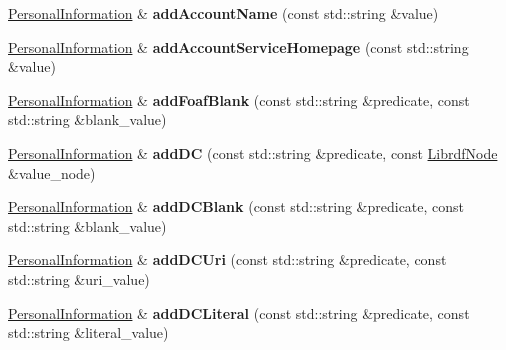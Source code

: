 \begin{DoxyCompactItemize}
\mbox{\label{classomexmeta_1_1PersonalInformation_a9fd33e3189e1f77725e54dd24cc9dcb7}} 
\hyperlink{classomexmeta_1_1PersonalInformation}{Personal\+Information} \& {\bfseries add\+Account\+Name} (const std\+::string \&value)
\item 
\mbox{\label{classomexmeta_1_1PersonalInformation_a344fc47bde65f8c0ea75409160fdfe00}} 
\hyperlink{classomexmeta_1_1PersonalInformation}{Personal\+Information} \& {\bfseries add\+Account\+Service\+Homepage} (const std\+::string \&value)
\item 
\mbox{\label{classomexmeta_1_1PersonalInformation_af26bf72dc840b9c45fa7494f7164c04d}} 
\hyperlink{classomexmeta_1_1PersonalInformation}{Personal\+Information} \& {\bfseries add\+Foaf\+Blank} (const std\+::string \&predicate, const std\+::string \&blank\+\_\+value)
\item 
\mbox{\label{classomexmeta_1_1PersonalInformation_a1df32d40f46d98767fc360015bf0f3ed}} 
\hyperlink{classomexmeta_1_1PersonalInformation}{Personal\+Information} \& {\bfseries add\+DC} (const std\+::string \&predicate, const \hyperlink{classredland_1_1LibrdfNode}{Librdf\+Node} \&value\+\_\+node)
\item 
\mbox{\label{classomexmeta_1_1PersonalInformation_a1458c6e092a9436a956ffd6a92c71d16}} 
\hyperlink{classomexmeta_1_1PersonalInformation}{Personal\+Information} \& {\bfseries add\+D\+C\+Blank} (const std\+::string \&predicate, const std\+::string \&blank\+\_\+value)
\item 
\mbox{\label{classomexmeta_1_1PersonalInformation_a1c605320ec0f12dda246cc3abdb0aeae}} 
\hyperlink{classomexmeta_1_1PersonalInformation}{Personal\+Information} \& {\bfseries add\+D\+C\+Uri} (const std\+::string \&predicate, const std\+::string \&uri\+\_\+value)
\item 
\mbox{\label{classomexmeta_1_1PersonalInformation_a843d2eddcdb33fc49d7de5059f5fa04c}} 
\hyperlink{classomexmeta_1_1PersonalInformation}{Personal\+Information} \& {\bfseries add\+D\+C\+Literal} (const std\+::string \&predicate, const std\+::string \&literal\+\_\+value)

\end{DoxyCompactItemize}
